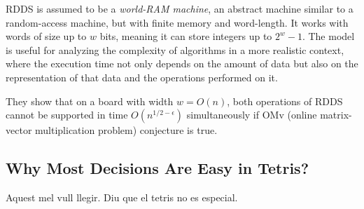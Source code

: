 RDDS is assumed to be a \emph{world-RAM machine}, an abstract machine similar to a random-access machine, but with finite memory and word-length. It works with words of size up to $ w $ bits, meaning it can store integers up to $2^{w} - 1$. 
The model is useful for analyzing the complexity of algorithms in a more realistic context, where the execution time not only depends on the amount of data but also on the representation of that data and the operations performed on it. 

They show that on a board with width $w = O(n)$, both operations of RDDS  cannot be supported in time $O(n^{1 / 2 - \epsilon})$ simultaneously if OMv (online matrix-vector multiplication problem) conjecture is true. 


\subsection{Why Most Decisions Are Easy in Tetris?}

Aquest mel vull llegir. Diu que el tetris no es especial.
